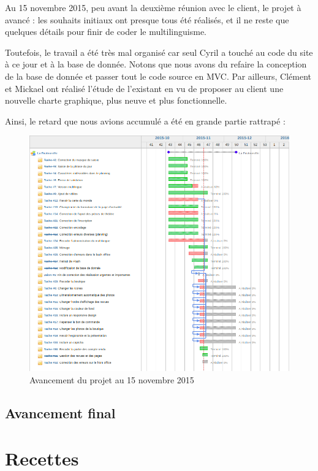 \documentclass[11pt]{report}
\begin{document}
Au 15 novembre 2015, peu avant la deuxième réunion avec le client, le projet à
avancé : les souhaits initiaux ont presque tous été réalisés, et il ne reste que
quelques détails pour finir de coder le multilinguisme.
\par Toutefois, le travail a été très mal organisé car seul Cyril a touché au
code du site à ce jour et à la base de donnée. Notons que nous avons du refaire
la conception de la base de donnée et passer tout le code source en MVC. Par
ailleurs, Clément et Mickael ont réalisé l'étude de l'existant en vu de proposer
au client une nouvelle charte graphique, plus neuve et plus fonctionnelle.
\par Ainsi, le retard que nous avions accumulé a été en grande partie rattrapé : 

\begin{landscape}
\begin{figure}[t]
    \caption{Avancement du projet au 15 novembre 2015}
   \includegraphics[scale=0.5]{include/gantt15-11.png}
\end{figure}
\end{landscape}

\subsection{Avancement final}

\section{Recettes}
\end{document}
